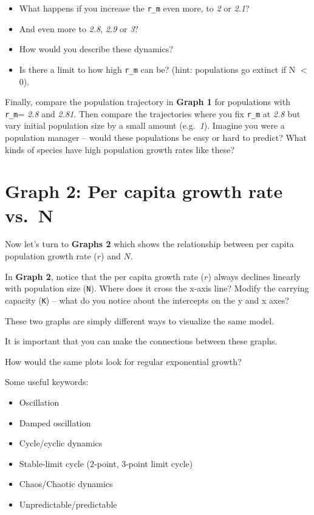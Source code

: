 \documentclass[
  a4paper]{book}
\providecommand{\tightlist}{%
  \setlength{\itemsep}{0pt}\setlength{\parskip}{0pt}}
\begin{document}
\begin{itemize}
\tightlist
\item
  What happens if you increase the \texttt{r\_m} even more, to \emph{2} or \emph{2.1}?
\item
  And even more to \emph{2.8}, \emph{2.9} or \emph{3}?
\item
  How would you describe these dynamics?
\item
  Is there a limit to how high \texttt{r\_m} can be? (hint: populations go extinct if N \(<\) 0).
\end{itemize}

Finally, compare the population trajectory in \textbf{Graph 1} for populations with \texttt{r\_m}= \emph{2.8} and \emph{2.81}. Then compare the trajectories where you fix \texttt{r\_m} at \emph{2.8} but vary initial population size by a small amount (e.g.~\emph{1}). Imagine you were a population manager -- would these populations be easy or hard to predict? What kinds of species have high population growth rates like these?

\hypertarget{graph-2-per-capita-growth-rate-vs.-n}{%
\section{Graph 2: Per capita growth rate vs.~N}\label{graph-2-per-capita-growth-rate-vs.-n}}

Now let's turn to \textbf{Graphs 2} which shows the relationship between per capita population growth rate (\(r\)) and \(N\).

In \textbf{Graph 2}, notice that the per capita growth rate (\(r\)) always declines linearly with population size (\texttt{N}). Where does it cross the x-axis line? Modify the carrying capacity (\texttt{K}) -- what do you notice about the intercepts on the y and x axes?

\begin{do-something}
These two graphs are simply different ways to visualize the same model.

It is important that you can make the connections between these graphs.

How would the same plots look for regular exponential growth?
\end{do-something}

Some useful keywords:

\begin{itemize}
\tightlist
\item
  Oscillation
\item
  Damped oscillation
\item
  Cycle/cyclic dynamics
\item
  Stable-limit cycle (2-point, 3-point limit cycle)
\item
  Chaos/Chaotic dynamics
\item
  Unpredictable/predictable
\end{itemize}
\end{document}
